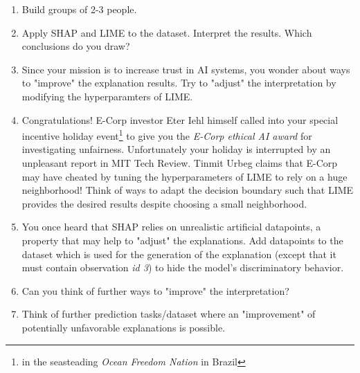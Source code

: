 \documentclass[a4paper]{article}
\begin{document}
{\begin{enumerate}
    \item Build groups of 2-3 people.
    \item Apply SHAP and LIME to the dataset. Interpret the results. Which conclusions do you draw?
    \item Since your mission is to increase trust in AI systems, you wonder about ways to "improve" the explanation results. Try to "adjust" the interpretation by modifying the hyperparamters of LIME.
    \item Congratulations! E-Corp investor Eter Iehl himself called into your special incentive holiday event\footnote{in the seasteading \textit{Ocean Freedom Nation} in Brazil} to give you the \textit{E-Corp ethical AI award} for investigating unfairness. Unfortunately your holiday is interrupted by an unpleasant report in MIT Tech Review. Tinmit Urbeg claims that E-Corp may have cheated by tuning the hyperparameters of LIME to rely on a huge neighborhood! Think of ways to adapt the decision boundary such that LIME provides the desired results despite choosing a small neighborhood.
    \item You once heard that SHAP relies on unrealistic artificial datapoints, a property that may help to "adjust" the explanations. Add datapoints to the dataset which is used for the generation of the explanation (except that it must contain observation \textit{id 3}) to hide the model's discriminatory behavior.
    \item Can you think of further ways to "improve" the interpretation?
    \item Think of further prediction tasks/dataset where an "improvement" of potentially unfavorable explanations is possible.
\end{enumerate}

}

\dlz

\end{document}
